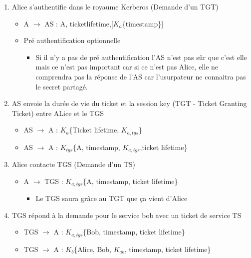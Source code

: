 \documentclass[a4paper]{article}
\begin{document}
      \begin{enumerate}
        \item Alice s'authentifie dans le royaume Kerberos (Demande d'un TGT)
        \begin{itemize}[label=, font=\scriptsize]
          \item A $\rightarrow$ AS : A, ticketlifetime,[$K_a$\{timestamp\}]
          \item Pré authentification optionnelle
          \begin{itemize}
            \item Si il n’y a pas de pré authentification l’AS n’est pas sûr que c’est elle mais ce n’est pas important car si ce n’est pas Alice, 
            elle ne comprendra pas la réponse de l’AS car l’usurpateur ne connaitra pas le secret partagé.
          \end{itemize}
        \end{itemize}
        \item AS envoie la durée de vie du ticket et la session key (TGT - Ticket Granting Ticket) entre ALice et le TGS
        \begin{itemize}[label=, font=\scriptsize]
          \item AS $\rightarrow$ A : $K_a$\{Ticket lifetime, $K_{a,tgs}$\}
          \item AS $\rightarrow$ A : $K_{tgs}$\{A, timestamp, $K_{a,tgs}$,ticket lifetime\}
        \end{itemize}
        \item Alice contacte TGS (Demande d'un TS)
        \begin{itemize}[label=, font=\scriptsize]
          \item A $\rightarrow$ TGS : $K_{a,tgs}$\{A, timestamp, ticket lifetime\}
          \begin{itemize}
            \item Le TGS saura grâce au TGT que ça vient d'Alice
          \end{itemize}
        \end{itemize}
        \item TGS répond à la demande pour le service bob avec un ticket de service TS
        \begin{itemize}[label=, font=\scriptsize]
          \item TGS $\rightarrow$ A : $K_{a,tgs}$\{Bob, timestamp, ticket lifetime\}
          \item TGS $\rightarrow$ A : $K_{b}$\{Alice, Bob, $K_{ab}$, timestamp, ticket lifetime\}

\end{itemize}
\end{enumerate}
\end{document}
